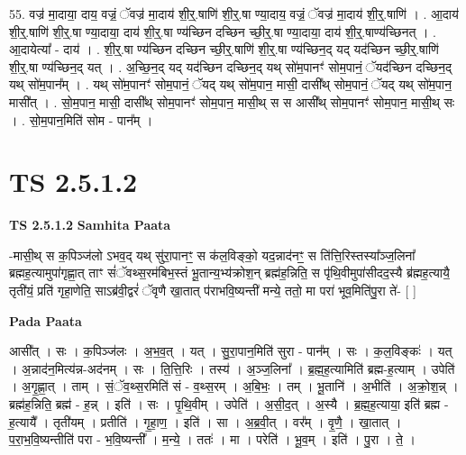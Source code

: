 \documentclass[17pt]{extarticle}
\begin{document}
55. वज्र॑ मा॒दाया॒ दाय॒ वज्रं॒ ॅवज्र॑ मा॒दाय॑ शी॒र्॒.षाणि॑ शी॒र्॒.षा ण्या॒दाय॒ वज्रं॒ ॅवज्र॑ मा॒दाय॑ शी॒र्॒.षाणि॑ । . आ॒दाय॑ शी॒र्॒.षाणि॑ शी॒र्॒.षा ण्या॒दाया॒ दाय॑ शी॒र्॒.षा ण्य॑च्छिन दच्छिन च्छी॒र्॒.षा ण्या॒दाया॒ दाय॑ शी॒र्॒.षाण्य॑च्छिनत् । . आ॒दायेत्या᳚ - दाय॑ । . शी॒र्॒.षा ण्य॑च्छिन दच्छिन च्छी॒र्॒.षाणि॑ शी॒र्॒.षा ण्य॑च्छिन॒द् यद् यद॑च्छिन च्छी॒र्॒.षाणि॑ शी॒र्॒.षा ण्य॑च्छिन॒द् यत् । . अ॒च्छि॒न॒द् यद् यद॑च्छिन दच्छिन॒द् यथ् सो॑म॒पानꣳ॑ सोम॒पानं॒ ॅयद॑च्छिन दच्छिन॒द् यथ् सो॑म॒पान᳚म् । . यथ् सो॑म॒पानꣳ॑ सोम॒पानं॒ ॅयद् यथ् सो॑म॒पान॒ मासी॒ दासी᳚थ् सोम॒पानं॒ ॅयद् यथ् सो॑म॒पान॒ मासी᳚त् । . सो॒म॒पान॒ मासी॒ दासी᳚थ् सोम॒पानꣳ॑ सोम॒पान॒ मासी॒थ् स स आसी᳚थ् सोम॒पानꣳ॑ सोम॒पान॒ मासी॒थ् सः । . सो॒म॒पान॒मिति॑ सोम - पान᳚म् । \newline
\pagebreak
{}

\section{ TS 2.5.1.2 }

\textbf{TS 2.5.1.2 } \newline
\textbf{Samhita Paata} \newline

-मासी॒थ् स क॒पिञ्ज॑लो ऽभव॒द् यथ् सु॑रा॒पानꣳ॒॒ स क॑ल॒विङ्को॒ यद॒न्नाद॑नꣳ॒॒ स ति॑त्ति॒रिस्तस्या᳚ञ्ज॒लिना᳚ ब्रह्मह॒त्यामुपा॑गृह्णा॒त् ताꣳ सं॑ॅवथ्स॒रम॑बिभ॒स्तं भू॒तान्य॒भ्य॑क्रोश॒न् ब्रह्म॑ह॒न्निति॒ स पृ॑थि॒वीमुपा॑सीदद॒स्यै ब्र॑ह्मह॒त्यायै॒ तृती॑यं॒ प्रति॑ गृहा॒णेति॒ साऽब्र॑वी॒द्वरं॑ ॅवृणै खा॒तात् प॑राभवि॒ष्यन्ती॑ मन्ये॒ ततो॒ मा परा॑ भूव॒मिति॑पु॒रा ते॑-  [  ] \newline

\textbf{Pada Paata} \newline

आसी᳚त् । सः । क॒पिञ्ज॑लः । अ॒भ॒व॒त् । यत् । सु॒रा॒पान॒मिति॑ सुरा - पान᳚म् । सः । क॒ल॒विङ्कः॑ । यत् । अ॒न्नाद॑न॒मित्य॑न्न-अद॑नम् । सः । ति॒त्ति॒रिः । तस्य॑ । अ॒ञ्ज॒लिना᳚ । ब्र॒ह्म॒ह॒त्यामिति॑ ब्रह्म-ह॒त्याम् । उपेति॑ । अ॒गृ॒ह्णा॒त् । ताम् । सं॒ॅव॒थ्स॒रमिति॑ सं - व॒थ्स॒रम् । अ॒बि॒भः॒ । तम् । भू॒तानि॑ । अ॒भीति॑ । अ॒क्रो॒श॒न्न् । ब्रह्म॑ह॒न्निति॒ ब्रह्म॑ - ह॒न्न् । इति॑ । सः । पृ॒थि॒वीम् । उपेति॑ ।  अ॒सी॒द॒त् । अ॒स्यै । ब्र॒ह्म॒ह॒त्याया॒ इति॑ ब्रह्म - ह॒त्यायै᳚ । तृती॑यम् । प्रतीति॑ । गृ॒हा॒ण॒ । इति॑ । सा । अ॒ब्र॒वी॒त् । वर᳚म् । वृ॒णै॒ । खा॒तात् । प॒रा॒भ॒वि॒ष्यन्तीति॑ परा - भ॒वि॒ष्यन्ती᳚ । म॒न्ये॒ । ततः॑ । मा । परेति॑ । भू॒व॒म् । इति॑ । पु॒रा । ते॒ ।  \newline
\end{document}
